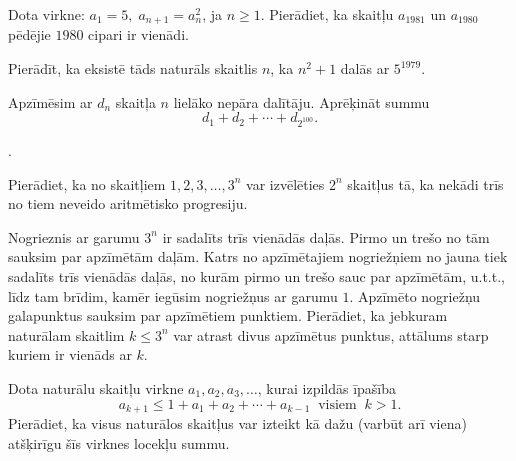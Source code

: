 \documentclass[a4paper,12pt]{article}
\begin{document}
\vspace{10pt}
\begin{problem}
Dota virkne: $a_1=5,\;a_{n+1}=a_n^2$, ja $n \geq 1$. 
Pierādiet, ka skaitļu $a_{1981}$ un $a_{1980}$ pēdējie $1980$ cipari ir vienādi.
\end{problem}




\vspace{10pt}
\begin{problem}
Pierādīt, ka eksistē tāds naturāls skaitlis $n$, ka $n^2+1$ dalās ar $5^{1979}$.
\end{problem}


\vspace{10pt}
\begin{problem}
Apzīmēsim ar $d_n$  skaitļa $n$ lielāko nepāra dalītāju. Aprēķināt summu
$$d_1 + d_2 + \cdots + d_{2^{100}}.$$
\end{problem}


	 .
	 

\vspace{10pt}
\begin{problem}
Pierādiet, ka no skaitļiem $1,2,3,\ldots,3^n$ var izvēlēties $2^n$ skaitļus tā, 
ka nekādi trīs no tiem neveido aritmētisko progresiju.
\end{problem}



\vspace{10pt}
\begin{problem}
Nogrieznis ar garumu $3^n$ ir sadalīts trīs vienādās daļās. 
Pirmo un trešo no tām sauksim par apzīmētām daļām. 
Katrs no apzīmētajiem nogriežņiem no jauna tiek sadalīts trīs 
vienādās daļās, no kurām pirmo un trešo sauc par apzīmētām, u.t.t., 
līdz tam brīdim, kamēr iegūsim nogriežņus ar garumu $1$. 
Apzīmēto nogriežņu galapunktus sauksim par apzīmētiem punktiem. 
Pierādiet, ka jebkuram naturālam skaitlim $k \leq 3^n$ 
var atrast divus apzīmētus punktus, attālums starp kuriem ir vienāds ar $k$.
\end{problem}


\vspace{10pt}
\begin{problem}
Dota naturālu skaitļu virkne $a_1,a_2,a_3,\ldots$, kurai izpildās īpašība
$$a_{k+1} \leq 1 + a_1 + a_2 + \cdots + a_{k-1}\;\;\mbox{visiem}\;\;k>1.$$
Pierādiet, ka visus naturālos skaitļus var izteikt kā dažu (varbūt arī viena) atšķirīgu šīs virknes locekļu summu.
\end{problem}
\end{document}
